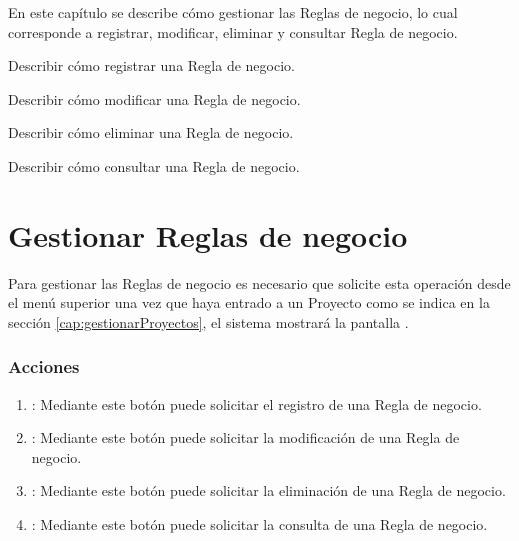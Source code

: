 
En este capítulo se describe cómo gestionar las Reglas de negocio, lo cual corresponde a registrar, modificar, eliminar y
consultar Regla de negocio.\\


\begin{objetivos}
	\item Describir cómo registrar una Regla de negocio.
	\item Describir cómo modificar una Regla de negocio.
	\item Describir cómo eliminar una Regla de negocio.
	\item Describir cómo consultar una Regla de negocio.
\end{objetivos}

\section{Gestionar Reglas de negocio}

Para gestionar las Reglas de negocio es necesario que solicite esta operación desde el menú superior una vez que haya entrado a un Proyecto como se indica en la sección \ref{cap:gestionarProyectos}, el sistema mostrará la pantalla .


\subsubsection{Acciones}

\begin{enumerate}
	\item {}: Mediante este botón puede solicitar el registro de una Regla de negocio.
	\item {}: Mediante este botón puede solicitar la modificación de una Regla de negocio.
	\item {}: Mediante este botón puede solicitar la eliminación de una Regla de negocio.
	\item {}: Mediante este botón puede solicitar la consulta de una Regla de negocio.
\end{enumerate}






